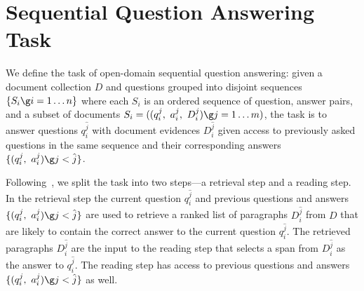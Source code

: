 \section{Sequential Question Answering Task}


We define the task of open-domain sequential question answering: given a document collection $D$ and questions 
grouped into disjoint sequences $\{ S_i \g i = 1 \dots n\}$ where each
$S_i$ is an ordered sequence of question, answer pairs, and a subset of
documents $S_i = ( (q_i^j,\ a_i^j,\ D_i^j) \g j = 1 \dots m )$, the task is
to answer  questions $q_i^{\hat{j}}$ with document evidences
$D_i^{\hat{j}}$ given access to previously asked questions in the same
sequence and their corresponding answers $\{ (q_i^j,\ a_i^j ) \g j<\hat{j} \}$.

Following~, we split the task into 
two steps---a
retrieval step and a reading step. In the retrieval step 
the current question $q_i^{\hat{j}}$ and previous 
questions and answers $\{ ( q_i^j,\ a_i^j ) \g j < \hat{j} \}$ are used
 to retrieve a ranked list of paragraphs
$D_i^{\hat{j}}$ from $D$ that are likely to contain the correct answer
to the current question $q_i^{\hat{j}}$.
The retrieved paragraphs $D_i^{\hat{j}}$ are the input to the
reading step that selects a span from 
$D_i^{\hat{j}}$ as the answer to $q_i^{\hat{j}}$. The reading step
has access to previous questions and answers 
$\{ ( q_i^j ,\ a_i^j ) \g j < \hat{j} \}$ as well.